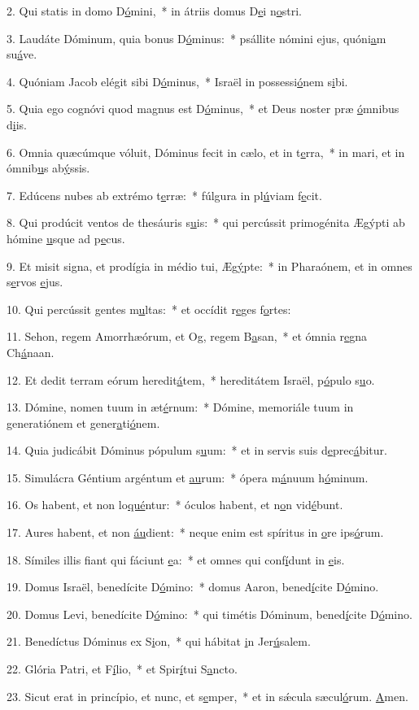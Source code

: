 2. Qui statis in domo D\uline{ó}mini,~* in átriis domus D\uline{e}i n\uline{o}stri.\par 
3. Laudáte Dóminum, quia bonus D\uline{ó}minus:~* psállite nómini ejus, quóni\uline{a}m su\uline{á}ve.\par 
4. Quóniam Jacob elégit sibi D\uline{ó}minus,~* Israël in possessi\uline{ó}nem s\uline{i}bi.\par 
5. Quia ego cognóvi quod magnus est D\uline{ó}minus,~* et Deus noster præ \uline{ó}mnibus d\uline{i}is.\par 
6. Omnia quæcúmque vóluit, Dóminus fecit in cælo, et in t\uline{e}rra,~* in mari, et in ómnib\uline{u}s ab\uline{ý}ssis.\par 
7. Edúcens nubes ab extrémo t\uline{e}rræ:~* fúlgura in pl\uline{ú}viam f\uline{e}cit.\par 
8. Qui prodúcit ventos de thesáuris s\uline{u}is:~* qui percússit primogénita Ægýpti ab hómine \uline{u}sque ad p\uline{e}cus.\par 
9. Et misit signa, et prodígia in médio tui, Æg\uline{ý}pte:~* in Pharaónem, et in omnes s\uline{e}rvos \uline{e}jus.\par 
10. Qui percússit gentes m\uline{u}ltas:~* et occídit r\uline{e}ges f\uline{o}rtes:\par 
11. Sehon, regem Amorrhæórum, et Og, regem B\uline{a}san,~* et ómnia r\uline{e}gna Ch\uline{á}naan.\par 
12. Et dedit terram eórum heredit\uline{á}tem,~* hereditátem Israël, p\uline{ó}pulo s\uline{u}o.\par 
13. Dómine, nomen tuum in æt\uline{é}rnum:~* Dómine, memoriále tuum in generatiónem et gener\uline{a}ti\uline{ó}nem.\par 
14. Quia judicábit Dóminus pópulum s\uline{u}um:~* et in servis suis d\uline{e}prec\uline{á}bitur.\par 
15. Simulácra Géntium argéntum et \uline{au}rum:~* ópera m\uline{á}nuum h\uline{ó}minum.\par 
16. Os habent, et non lo\uline{qué}ntur:~* óculos habent, et n\uline{o}n vid\uline{é}bunt.\par 
17. Aures habent, et non \uline{áu}dient:~* neque enim est spíritus in \uline{o}re ips\uline{ó}rum.\par 
18. Símiles illis fiant qui fáciunt \uline{e}a:~* et omnes qui conf\uline{í}dunt in \uline{e}is.\par 
19. Domus Israël, benedícite D\uline{ó}mino:~* domus Aaron, bened\uline{í}cite D\uline{ó}mino.\par 
20. Domus Levi, benedícite D\uline{ó}mino:~* qui timétis Dóminum, bened\uline{í}cite D\uline{ó}mino.\par 
21. Benedíctus Dóminus ex S\uline{i}on,~* qui hábitat \uline{i}n Jer\uline{ú}salem.\par 
22. Glória Patri, et F\uline{í}lio,~* et Spir\uline{í}tui S\uline{a}ncto.\par 
23. Sicut erat in princípio, et nunc, et s\uline{e}mper,~* et in sǽcula sæcul\uline{ó}rum. \uline{A}men.\par 
